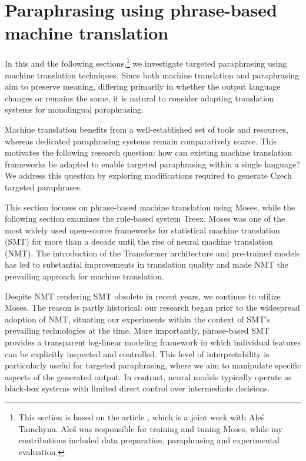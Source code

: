 \section{Paraphrasing using phrase-based machine translation}
\label{moses}

In this and the following sections,\footnote{This section is based on the article \citep{barancikova:itat2014}, which is a joint work with Aleš Tamchyna. Aleš was responsible for training and tuning Moses, while my contributions included data preparation, paraphrasing and experimental evaluation.} we investigate targeted paraphrasing using machine translation techniques. Since both machine translation and paraphrasing aim to preserve meaning, differing primarily in whether the output language changes or remains the same, it is natural to consider adapting translation systems for monolingual paraphrasing.

Machine translation benefits from a well-established set of tools and resources, whereas dedicated paraphrasing systems remain comparatively scarce. This motivates the following research question: how can existing machine translation frameworks be adapted to enable targeted paraphrasing within a single language? We address this question by exploring modifications required to generate Czech targeted paraphrases.

This section focuses on phrase-based machine translation using Moses, while the following section examines the rule-based system Treex. Moses \citep{moses} was one of the most widely used open-source frameworks for statistical machine translation (SMT) for more than a decade until the rise of neural machine translation (NMT). The introduction of the Transformer \citep{attention} architecture and pre-trained models has led to substantial improvements in translation quality and made NMT the prevailing approach for machine translation.

Despite NMT rendering SMT obsolete in recent years, we continue to utilize Moses. The reason is partly historical: our research began prior to the widespread adoption of NMT, situating our experiments within the context of SMT's prevailing technologies at the time.  More importantly, phrase-based SMT provides a transparent log-linear modeling framework in which individual features can be explicitly inspected and controlled. This level of interpretability is particularly useful for targeted paraphrasing, where we aim to manipulate specific aspects of the generated output. In contrast, neural models typically operate as black-box systems with limited direct control over intermediate decisions.

